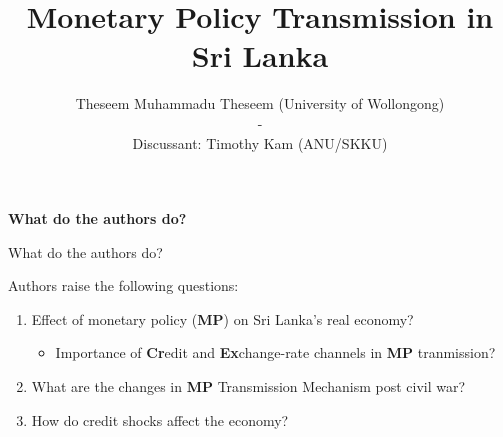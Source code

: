 \documentclass[10pt,english,slidetop,compress,
              blue,mathserif,color=option]{beamer}
\title[]{Monetary Policy Transmission in Sri Lanka}
\author[        ]{          
  Theseem Muhammadu Theseem {\color{gray}(University of Wollongong)} 
                      \\
                      -
                      \\
                       Discussant: Timothy Kam {\color{gray}(ANU/SKKU)}
                      }
\date{ \color{gray!80!blue}

      {\smaller PhD Conference, Nov 11-12, 2021}
      \\
      \bigskip
      {\small\href{\linkcomment}{$\langle$ More written comments here $\rangle$}}
      
}
\theoremstyle{plain}
\theoremstyle{definition}
\begin{document}
\begin{frame}
  \titlepage
\end{frame}



{
  \begin{frame}
    \begin{center}
      \bigskip
      \bigskip
      {\Huge\bfseries{\color{orange}What do the authors do?}}
      \bigskip

    \end{center}
  \end{frame}
}

\begin{frame}{What do the authors do?}

  Authors raise the following questions:
  \bigskip

  \begin{enumerate}
    \item Effect of monetary policy (\textbf{MP}) on Sri Lanka's real economy?
    \begin{itemize}
      \item Importance of \textbf{Cr}edit and \textbf{Ex}change-rate channels in \textbf{MP} tranmission?
    \end{itemize}

    \bigskip

    \item What are the changes in \textbf{MP} Transmission Mechanism post civil war?
    
    \bigskip

  \item How do credit shocks affect the economy?
  \end{enumerate}

\end{frame}
\end{document}

